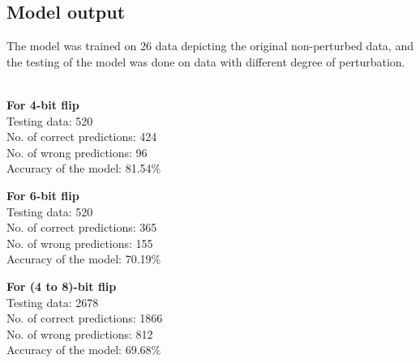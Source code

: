 \documentclass[12pt,a4paper,bold]{thesis}
\theoremstyle{thm}
\theoremstyle{definition}
\begin{document}
\subsection{Model output}
\indent\indent\indent The model was trained on 26 data depicting the original non-perturbed data, and the testing of the model was done on data with different degree of perturbation.\\\\
\begin{minipage}{0.5\linewidth}
\textbf{For 4-bit flip}\\
Testing data: 520\\
No. of correct predictions: 424\\
No. of wrong predictions: 96\\
Accuracy of the model: 81.54\%   \\
\end{minipage}
\hfill
\begin{minipage}{0.6\linewidth}
\textbf{For 6-bit flip}\\
Testing data: 520\\
No. of correct predictions: 365\\
No. of wrong predictions: 155\\
Accuracy of the model: 70.19\%   \\
\end{minipage}
\begin{minipage}{0.6\linewidth}
\textbf{For (4 to 8)-bit flip}\\
Testing data: 2678\\
No. of correct predictions: 1866\\
No. of wrong predictions: 812\\
Accuracy of the model: 69.68\%   \\
\end{minipage}

  
\end{document}
